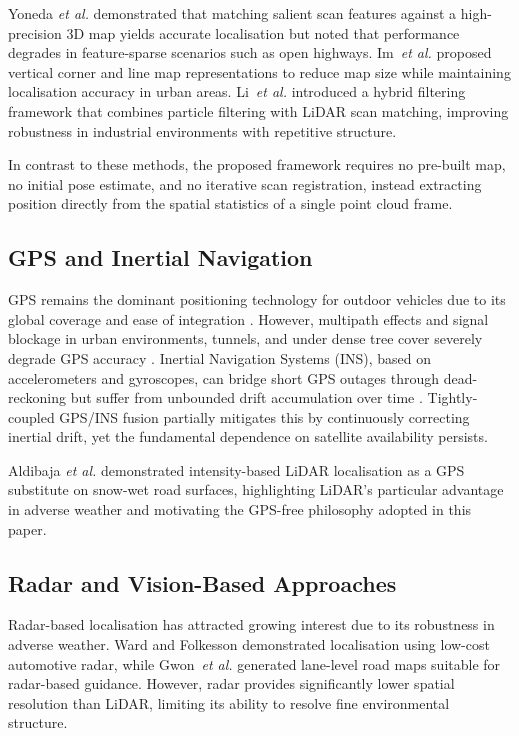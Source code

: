 \documentclass[lettersize,journal]{IEEEtran}
\begin{document}
Yoneda \textit{et al.} \cite{yoneda2014lidar} demonstrated that matching salient
scan features against a high-precision 3D map yields accurate localisation but noted
that performance degrades in feature-sparse scenarios such as open highways.
Im~\textit{et al.} \cite{im2016vertical,im2018extended} proposed vertical corner
and line map representations to reduce map size while maintaining localisation
accuracy in urban areas. Li~\textit{et al.} \cite{li2018hybrid} introduced a hybrid
filtering framework that combines particle filtering with LiDAR scan matching,
improving robustness in industrial environments with repetitive structure.

In contrast to these methods, the proposed framework requires no pre-built map,
no initial pose estimate, and no iterative scan registration, instead extracting
position directly from the spatial statistics of a single point cloud frame.

\subsection{GPS and Inertial Navigation}

GPS remains the dominant positioning technology for outdoor vehicles due to its
global coverage and ease of integration \cite{luo2019localization}. However,
multipath effects and signal blockage in urban environments, tunnels, and under
dense tree cover severely degrade GPS accuracy \cite{schreiber2016vehicle}.
Inertial Navigation Systems (INS), based on accelerometers and gyroscopes, can
bridge short GPS outages through dead-reckoning but suffer from unbounded drift
accumulation over time \cite{wang2016accurate}. Tightly-coupled GPS/INS fusion
partially mitigates this by continuously correcting inertial drift, yet the
fundamental dependence on satellite availability persists.

Aldibaja \textit{et al.} \cite{aldibaja2017robust} demonstrated intensity-based
LiDAR localisation as a GPS substitute on snow-wet road surfaces, highlighting
LiDAR's particular advantage in adverse weather and motivating the GPS-free
philosophy adopted in this paper.

\subsection{Radar and Vision-Based Approaches}

Radar-based localisation has attracted growing interest due to its robustness in
adverse weather. Ward and Folkesson \cite{ward2016vehicle} demonstrated localisation
using low-cost automotive radar, while Gwon~\textit{et al.} \cite{gwon2017generation}
generated lane-level road maps suitable for radar-based guidance. However, radar
provides significantly lower spatial resolution than LiDAR, limiting its ability to
resolve fine environmental structure.
\end{document}
